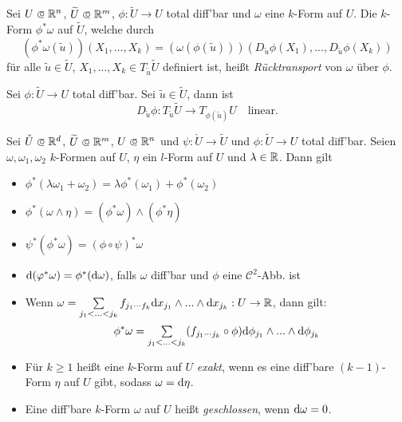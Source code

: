 \documentclass{cheat-sheet}
\theoremstyle{definition}
\begin{document}
\begin{defn}
  Sei $U \opn \R^n$, $\widetilde{U} \opn \R^m$, $\phi : \widetilde{U} \to U$ total diff'bar und $\omega$ eine $k$-Form auf $U$. Die $k$-Form $\phi^* \omega$ auf $\widetilde{U}$, welche durch
  \[ (\phi^* \omega (\widetilde{u})) (X_1, ..., X_k) = (\omega (\phi(\widetilde{u})))(D_{\widetilde{u}} \phi (X_1), ..., D_{\widetilde{u}} \phi (X_k))  \]
  für alle $\widetilde{u} \in \widetilde{U}$, $X_1, ..., X_k \in T_{\widetilde{u}} \widetilde{U}$ definiert ist, heißt \emph{Rücktransport} von $\omega$ über $\phi$.
\end{defn}

\begin{anmerkung}
  Sei $\phi : \widetilde{U} \to U$ total diff'bar. Sei $\widetilde{u} \in \widetilde{U}$, dann ist
  \[ D_{\widetilde{u}} \phi : T_{\widetilde{u}} \widetilde{U} \to T_{\phi(\widetilde{u})} U \quad \text{linear}. \]
\end{anmerkung}

\begin{satz}

  Sei $\check{U} \opn \R^d$, $\widetilde{U} \opn \R^m$, $U \opn \R^n$ und $\psi : \check{U} \to \widetilde{U}$ und $\phi : \widetilde{U} \to U$ total diff'bar.
  Seien $\omega, \omega_1, \omega_2$ $k$-Formen auf $U$, $\eta$ ein $l$-Form auf $U$ und $\lambda \in \mathbb{R}$. Dann gilt

  \begin{itemize}
    \item $\phi^*(\lambda \omega_1 + \omega_2) = \lambda \phi^*(\omega_1) + \phi^*(\omega_2)$ 
    \item $\phi^*(\omega \wedge \eta) = (\phi^* \omega) \wedge (\phi^* \eta)$ 
    \item $\psi^*(\phi^* \omega) = (\phi \circ \psi)^* \omega$ 
    \item $\mathrm{d} (\varphi^* \omega) = \phi^* (\mathrm{d} \omega)$, falls $\omega$ diff'bar und $\phi$ eine $\mathcal{C}^2$-Abb. ist
    \item Wenn $\omega = \sum_{j_1 < ... < j_k} f_{j_1 \cdots f_k} \d x_{j_1} \wedge ... \wedge \d x_{j_k} : U \to \R$, dann gilt:
    \[ \phi^* \omega = \sum_{j_1 < ... < j_k} (f_{j_1 \cdots j_k} \circ \phi) \d \phi_{j_1} \wedge ... \wedge \d \phi_{j_k} \]
  \end{itemize}
\end{satz}

\begin{defn}
  \begin{itemize}
    \item Für $k \geq 1$ heißt eine $k$-Form auf $U$ \emph{exakt}, wenn es eine diff'bare $(k{-}1)$-Form $\eta$ auf $U$ gibt, sodass $\omega = \mathrm{d} \eta$.
    \item Eine diff'bare $k$-Form $\omega$ auf $U$ heißt \emph{geschlossen}, wenn $\mathrm{d} \omega = 0$.
  \end{itemize}
\end{defn}
\end{document}
